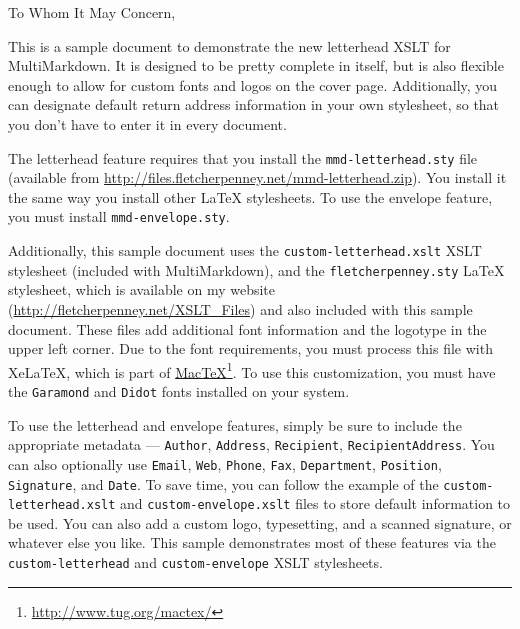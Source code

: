 
\def\mytitle{Test Letter  }
\def\myauthor{John Doe  }
\def\email{fletcher@example.net  }
\def\address{123 Main St.  \\
Some City, ST  12345  \\
}
\def\recipient{Some Person  }
\def\recipientaddress{321 Main St  \\
Some City, ST  54321  \\
}
\def\phone{(555) 555-5555  }
\def\mydate{December 15, 2007  }
\def\latexxslt{custom-letterhead.xslt  }

\def\latexmode{memoir  }
\def\blackandwhite{true  }
To Whom It May Concern,

This is a sample document to demonstrate the new letterhead XSLT for
MultiMarkdown. It is designed to be pretty complete in itself, but is also
flexible enough to allow for custom fonts and logos on the cover page.
Additionally, you can designate default return address information in your own
stylesheet, so that you don't have to enter it in every document.

The letterhead feature requires that you install the \texttt{mmd-letterhead.sty} file
(available from \href{http://files.fletcherpenney.net/mmd-letterhead.zip}{http:\slash \slash files.fletcherpenney.net\slash mmd-letterhead.zip}). You
install it the same way you install other LaTeX stylesheets. To use the
envelope feature, you must install \texttt{mmd-envelope.sty}.

Additionally, this sample document uses the \texttt{custom-letterhead.xslt} XSLT
stylesheet (included with MultiMarkdown), and the \texttt{fletcherpenney.sty} LaTeX
stylesheet, which is available on my website
(\href{http://fletcherpenney.net/XSLT_Files}{http:\slash \slash fletcherpenney.net\slash XSLT\_Files}) and also included with this sample
document. These files add additional font information and the logotype in the
upper left corner. Due to the font requirements, you must process this file
with XeLaTeX, which is part of \href{http://www.tug.org/mactex/}{MacTeX}\footnote{\href{http://www.tug.org/mactex/}{http:\slash \slash www.tug.org\slash mactex\slash }}. To use
this customization, you must have the \texttt{Garamond} and \texttt{Didot} fonts installed
on your system.

To use the letterhead and envelope features, simply be sure to include the
appropriate metadata --- \texttt{Author}, \texttt{Address}, \texttt{Recipient}, \texttt{RecipientAddress}. You can also optionally use \texttt{Email}, \texttt{Web}, \texttt{Phone}, \texttt{Fax},
\texttt{Department}, \texttt{Position}, \texttt{Signature}, and \texttt{Date}. To save time, you can
follow the example of the \texttt{custom-letterhead.xslt} and \texttt{custom-envelope.xslt}
files to store default information to be used. You can also add a custom logo,
typesetting, and a scanned signature, or whatever else you like. This sample
demonstrates most of these features via the \texttt{custom-letterhead} and
\texttt{custom-envelope} XSLT stylesheets.

